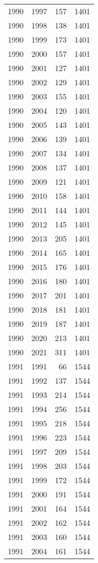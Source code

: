 \documentclass[
  11pt,
  letterpaper,
  DIV=11,
  numbers=noendperiod,
  twoside]{scrartcl}
\begin{document}
\begin{longtable}[]{@{}rrrr@{}}
1990 & 1997 & 157 & 1401 \\
1990 & 1998 & 138 & 1401 \\
1990 & 1999 & 173 & 1401 \\
1990 & 2000 & 157 & 1401 \\
1990 & 2001 & 127 & 1401 \\
1990 & 2002 & 129 & 1401 \\
1990 & 2003 & 155 & 1401 \\
1990 & 2004 & 120 & 1401 \\
1990 & 2005 & 143 & 1401 \\
1990 & 2006 & 139 & 1401 \\
1990 & 2007 & 134 & 1401 \\
1990 & 2008 & 137 & 1401 \\
1990 & 2009 & 121 & 1401 \\
1990 & 2010 & 158 & 1401 \\
1990 & 2011 & 144 & 1401 \\
1990 & 2012 & 145 & 1401 \\
1990 & 2013 & 205 & 1401 \\
1990 & 2014 & 165 & 1401 \\
1990 & 2015 & 176 & 1401 \\
1990 & 2016 & 180 & 1401 \\
1990 & 2017 & 201 & 1401 \\
1990 & 2018 & 181 & 1401 \\
1990 & 2019 & 187 & 1401 \\
1990 & 2020 & 213 & 1401 \\
1990 & 2021 & 311 & 1401 \\
1991 & 1991 & 66 & 1544 \\
1991 & 1992 & 137 & 1544 \\
1991 & 1993 & 214 & 1544 \\
1991 & 1994 & 256 & 1544 \\
1991 & 1995 & 218 & 1544 \\
1991 & 1996 & 223 & 1544 \\
1991 & 1997 & 209 & 1544 \\
1991 & 1998 & 203 & 1544 \\
1991 & 1999 & 172 & 1544 \\
1991 & 2000 & 191 & 1544 \\
1991 & 2001 & 164 & 1544 \\
1991 & 2002 & 162 & 1544 \\
1991 & 2003 & 160 & 1544 \\
1991 & 2004 & 161 & 1544 \\

\end{longtable}
\end{document}
